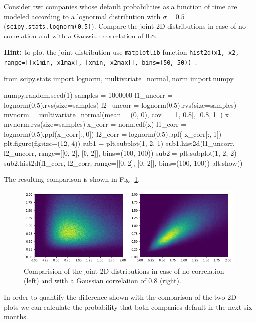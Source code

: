 \begin{question}
Consider two companies whose default probabilities as a function of time are modeled according to a lognormal distribution with $\sigma =0.5$ (\texttt{scipy.stats.lognorm(0.5)}). Compare the joint 2D distributions in case of no correlation and with a Gaussian correlation of 0.8.

\noindent\textbf{Hint:} to plot the joint distribution use \texttt{matplotlib} function \texttt{hist2d(x1, x2, range=[[x1min, x1max], [xmin, x2max]], bins=(50, 50)) }.
\end{question}

\cprotEnv\begin{solution}
\begin{ipython}
from scipy.stats import lognorm, multivariate_normal, norm
import numpy

numpy.random.seed(1)
samples = 1000000
l1_uncorr = lognorm(0.5).rvs(size=samples)
l2_uncorr = lognorm(0.5).rvs(size=samples)
mvnorm = multivariate_normal(mean = (0, 0), 
                             cov = [[1, 0.8],
                                    [0.8, 1]])
x = mvnorm.rvs(size=samples)
x_corr = norm.cdf(x)
l1_corr = lognorm(0.5).ppf(x_corr[:, 0])
l2_corr = lognorm(0.5).ppf(
x_corr[:, 1])
plt.figure(figsize=(12, 4))
sub1 = plt.subplot(1, 2, 1)
sub1.hist2d(l1_uncorr, l2_uncorr, range=[[0, 2], [0, 2]], bins=(100, 100))
sub2 = plt.subplot(1, 2, 2)
sub2.hist2d(l1_corr, l2_corr, range=[[0, 2], [0, 2]], bins=(100, 100))
plt.show()
\end{ipython}
\noindent 
The resulting comparison is shown in Fig.~\ref{fig:joint_2d}.
\begin{figure}[htbp]
\begin{center}
	\includegraphics[width=0.9\linewidth]{figures/copula_lognormal.png}
\end{center}
\caption{Comparision of the joint 2D distributions in case of no correlation (left) and with a Gaussian correlation of 0.8 (right).}
\label{fig:joint_2d}
\end{figure}

In order to quantify the difference shown with the comparison of the two 2D plots we can calculate the probability that both companies default in the next six months.


\end{solution}
